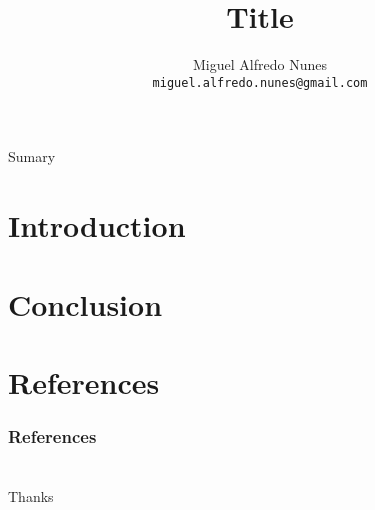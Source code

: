 \documentclass{beamer}
\title{Title}
\author{Miguel Alfredo Nunes \\ \small{\texttt{miguel.alfredo.nunes@gmail.com}}}
\date{}
\begin{document}
    \begin{frame}
        \titlepage
    \end{frame}

    \begin{frame}{Sumary}
        \tableofcontents
    \end{frame}

    \section{Introduction}
    \label{sec:introduction}
        
        \SecT
        

    \section{Conclusion}
        \label{sec:conclusion}

        \SecT

        

    \section{References}
        \label{sec:references}

        \SecT

        \begin{frame}[allowframebreaks]
            \frametitle{References}

            
            
        \end{frame}

    \section*{}
    \begin{frame}{}

        \begin{center}
            {\Huge Thanks}
            
            \vspace{\baselineskip}

            \vspace{\baselineskip}
            
            \insertauthor
        \end{center}
        
    \end{frame}
\end{document}
